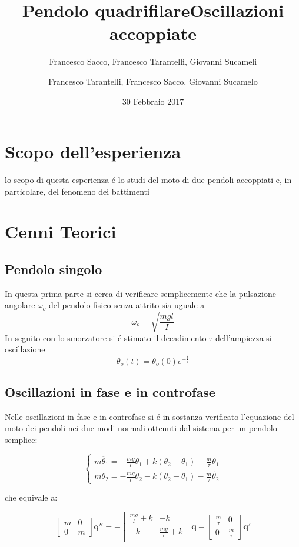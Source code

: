 \documentclass{exam}
\date{30 Febbraio 2017}
\title{Pendolo quadrifilare}
\author{Francesco Sacco, Francesco Tarantelli, Giovanni Sucameli}
\author{Francesco Tarantelli, Francesco Sacco, Giovanni Sucamelo}
\title{Oscillazioni accoppiate}
\begin{document}
	\maketitle
	\section{Scopo dell'esperienza}
		lo scopo di questa esperienza \'e lo studi del moto di due pendoli accoppiati e, in particolare, del fenomeno dei battimenti


	\section{Cenni Teorici}
		\subsection{Pendolo singolo}
			In questa prima parte si cerca di verificare semplicemente che la pulsazione angolare $\omega_o$ del pendolo fisico senza attrito sia uguale a 
			\begin{equation}
				\omega_o=\sqrt{\frac{mgl}{I}}
			\end{equation}
			In seguito con lo smorzatore si \'e stimato il decadimento $\tau $ dell'ampiezza si oscillazione
			\begin{equation}
				\theta_o(t)=\theta_o(0)e^{-\frac{t}{\tau}}
			\end{equation}
	\subsection{Oscillazioni in fase e in controfase}
		Nelle oscillazioni in fase e in controfase si \'e in sostanza verificato l'equazione del moto dei pendoli nei due modi normali ottenuti dal sistema per un pendolo semplice:

		\begin{equation}
			\begin{cases} 
				m \ddot{\theta_{1}}=-\frac{mg}{l}\theta_1 + k(\theta_2-\theta_1) -\frac{m}{\tau}\dot{\theta_1} \\
				m \ddot{\theta_{2}}=-\frac{mg}{l}\theta_2 -  k(\theta_2-\theta_1) - \frac{m}{\tau} \dot{\theta_{2}}
			\end{cases}
		\end{equation}

		che equivale a:

		\begin{equation}
			\begin{bmatrix}
				m & 0 \\
				0 & m
			\end{bmatrix}
			\mathbf{q''}=-
			\begin{bmatrix}
				\frac{mg}{l} + k & -k \\
				-k & \frac{mg}{l} + k \\
			\end{bmatrix}
			\mathbf{q} -
			\begin{bmatrix}
				\frac{m}{\tau} & 0 \\
				0 & \frac{m}{\tau} 
			\end{bmatrix}
			\mathbf{q'} 
		\end{equation}
\end{document}
